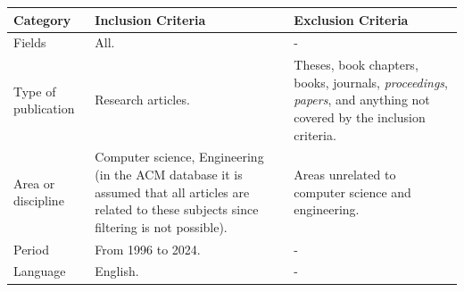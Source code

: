 \begin{table}
	{\begin{tabular}{p{2.7cm}p{5cm}p{5cm}} \toprule
			\textbf{Category}   & \textbf{Inclusion Criteria}                                                                                                                        & \textbf{Exclusion Criteria}                                                                                                        \\
			\midrule
			Fields              & All.                                                                                                                                               & -                                                                                                                                  \\
			Type of publication & Research articles.                                                                                                                                 & Theses, book chapters, books, journals, \textit{proceedings}, \textit{papers}, and anything not covered by the inclusion criteria. \\
			Area or discipline  & Computer science, Engineering (in the ACM database it is assumed that all articles are related to these subjects since filtering is not possible). & Areas unrelated to computer science and engineering.                                                                               \\
			Period              & From 1996 to 2024.                                                                                                                                 & -                                                                                                                                  \\
			Language            & English.                                                                                                                                           & -                                                                                                                                  \\
			\bottomrule
		\end{tabular}}
	\label{table:Criteria}
\end{table}

